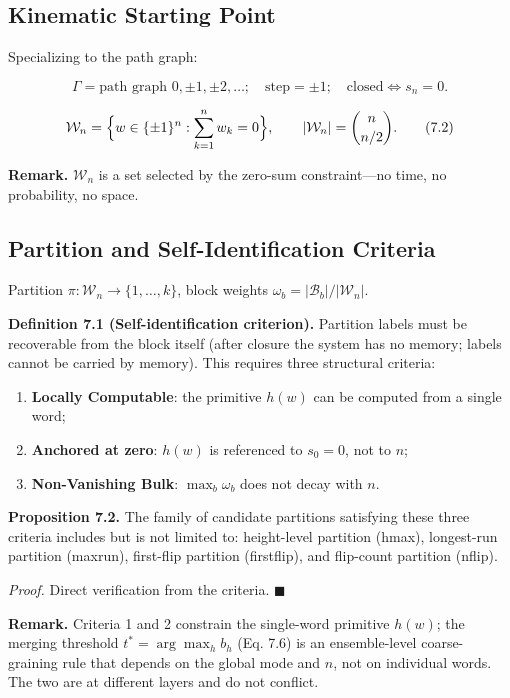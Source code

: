 \documentclass[
  11pt,
]{article}
\providecommand{\tightlist}{%
  \setlength{\itemsep}{0pt}\setlength{\parskip}{0pt}}
\begin{document}
\subsection{Kinematic Starting
Point}\label{kinematic-starting-point}

Specializing to the path graph:

\[
\Gamma = \text{path graph } 0,\pm1,\pm2,\dots; \quad \text{step} = \pm1; \quad \text{closed} \iff s_n=0.
\tag{7.1}
\]

\[
\mathcal{W}_n = \Bigl\{w\in\{\pm1\}^n:\sum_{k=1}^n w_k=0\Bigr\}, \qquad \rvert\mathcal{W}_n\rvert = \binom{n}{n/2}.
\tag{7.2}
\]

\textbf{Remark.} \(\mathcal{W}_n\) is a set selected by the zero-sum
constraint---no time, no probability, no space.

\subsection{Partition and Self-Identification
Criteria}\label{partition-and-self-identification-criteria}

Partition \(\pi:\mathcal{W}_n\to\{1,\dots,k\}\), block weights
\(\omega_b=\rvert\mathcal{B}_b\rvert/\rvert\mathcal{W}_n\rvert\).

\textbf{Definition 7.1 (Self-identification criterion).} Partition
labels must be recoverable from the block itself (after closure the
system has no memory; labels cannot be carried by memory). This requires
three structural criteria:

\begin{enumerate}
\def\labelenumi{\arabic{enumi}.}
\tightlist
\item
  \textbf{Locally Computable}: the primitive \(h(w)\) can be computed
  from a single word;
\item
  \textbf{Anchored at zero}: \(h(w)\) is referenced to \(s_0=0\), not to
  \(n\);
\item
  \textbf{Non-Vanishing Bulk}: \(\max_b\omega_b\) does not decay with
  \(n\).
\end{enumerate}

\textbf{Proposition 7.2.} The family of candidate partitions satisfying
these three criteria includes but is not limited to: height-level
partition (hmax), longest-run partition (maxrun), first-flip partition
(firstflip), and flip-count partition (nflip).

\emph{Proof.} Direct verification from the criteria. \(\blacksquare\)

\textbf{Remark.} Criteria 1 and 2 constrain the single-word primitive
\(h(w)\); the merging threshold \(t^*=\arg\max_h b_h\) (Eq. 7.6) is an
ensemble-level coarse-graining rule that depends on the global mode and
\(n\), not on individual words. The two are at different layers and do
not conflict.
\end{document}
